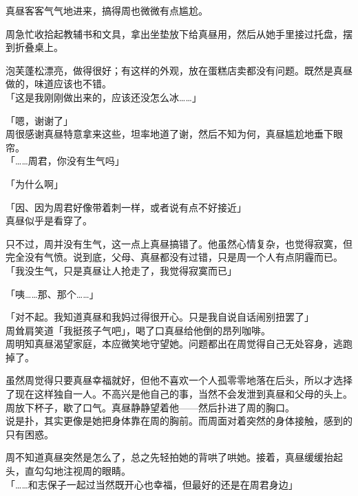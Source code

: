 真昼客客气气地进来，搞得周也微微有点尴尬。

周急忙收拾起教辅书和文具，拿出坐垫放下给真昼用，然后从她手里接过托盘，摆到折叠桌上。

泡芙蓬松漂亮，做得很好；有这样的外观，放在蛋糕店卖都没有问题。既然是真昼做的，味道应该也不错。\\

「这是我刚刚做出来的，应该还没怎么冰……」

「嗯，谢谢了」\\

周很感谢真昼特意拿来这些，坦率地道了谢，然后不知为何，真昼尴尬地垂下眼帘。\\

「……周君，你没有生气吗」

「为什么啊」

「因、因为周君好像带着刺一样，或者说有点不好接近」\\

真昼似乎是看穿了。

只不过，周并没有生气，这一点上真昼搞错了。他虽然心情复杂，也觉得寂寞，但完全没有气愤。说到底，父母、真昼都没有过错，只是周一个人有点阴霾而已。\\

「我没生气，只是真昼让人抢走了，我觉得寂寞而已」

「咦……那、那个……」

「对不起。我知道真昼和我妈过得很开心。只是我自说自话闹别扭罢了」\\

周耸肩笑道「我挺孩子气吧」，喝了口真昼给他倒的昂列咖啡。\\

周明知真昼渴望家庭，本应微笑地守望她。问题都出在周觉得自己无处容身，逃跑掉了。

虽然周觉得只要真昼幸福就好，但他不喜欢一个人孤零零地落在后头，所以才选择了现在这样独自一人。不高兴是他自己的事，当然不会发泄到真昼和父母的头上。\\

周放下杯子，歇了口气。真昼静静望着他——然后扑进了周的胸口。\\

说是扑，其实更像是她把身体靠在周的胸前。而周面对着突然的身体接触，感到的只有困惑。

周不知道真昼突然是怎么了，总之先轻拍她的背哄了哄她。接着，真昼缓缓抬起头，直勾勾地注视周的眼睛。\\

「……和志保子一起过当然既开心也幸福，但最好的还是在周君身边」\\

